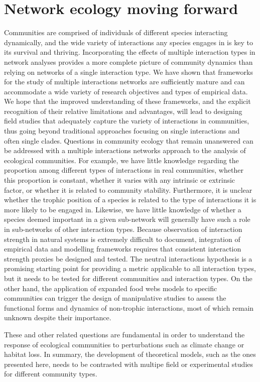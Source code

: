 \section{Network ecology moving forward}

Communities are comprised of individuals of different species interacting dynamically, and the wide variety of interactions any species engages in is key to its survival and thriving. Incorporating the effects of multiple interaction types in network analyses provides a more complete picture of community dynamics than relying on networks of a single interaction type. We have shown that frameworks for the study of multiple interactions networks are sufficiently mature and can accommodate a wide variety of research objectives and types of empirical data. We hope that the improved understanding of these frameworks, and the explicit recognition of their relative limitations and advantages, will lead to designing field studies that adequately capture the variety of interactions in communities, thus going beyond traditional approaches focusing on single interactions and often single clades. Questions in community ecology that remain unanswered can be addressed with a multiple interactions networks approach to the analysis of ecological communities. For example, we have little knowledge regarding the proportion among different types of interactions in real communities, whether this proportion is constant, whether it varies with any intrinsic or extrinsic factor, or whether it is related to community stability. Furthermore, it is unclear whether the trophic position of a species is related to the type of interactions it is more likely to be engaged in. Likewise, we have little knowledge of whether a species deemed important in a given sub-network will generally have such a role in sub-networks of other interaction types. Because observation of interaction strength in natural systems is extremely difficult to document, integration of empirical data and modelling frameworks requires that consistent interaction strength proxies be designed and tested. The neutral interactions hypothesis is a promising starting point for providing a metric applicable to all interaction types, but it needs to be tested for different communities and interaction types. On the other hand, the application of expanded food webs models to specific communities can trigger the design of manipulative studies to assess the functional forms and dynamics of non-trophic interactions, most of which remain unknown despite their importance.

These and other related questions are fundamental in order to understand the response of ecological communities to perturbations such as climate change or habitat loss. In summary, the development of theoretical models, such as the ones presented here, needs to be contrasted with multipe field or experimental studies for different community types.

